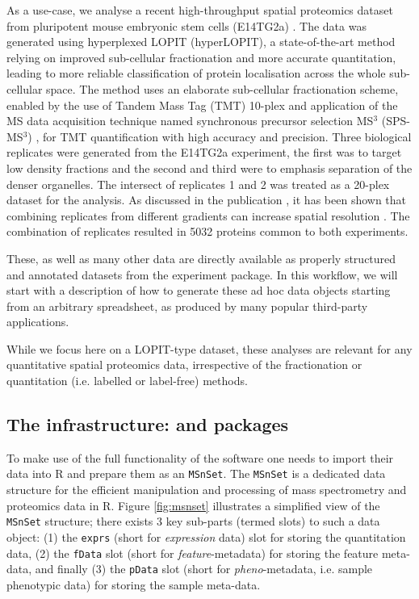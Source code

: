 As a use-case, we analyse a recent high-throughput spatial proteomics
dataset from pluripotent mouse embryonic stem cells (E14TG2a)
\cite{hyper}. The data was generated using hyperplexed LOPIT
(hyperLOPIT), a state-of-the-art method relying on improved
sub-cellular fractionation and more accurate quantitation, leading to
more reliable classification of protein localisation across the whole
sub-cellular space. The method uses an elaborate sub-cellular
fractionation scheme, enabled by the use of Tandem Mass Tag (TMT)
\cite{Thompson:2003} 10-plex and application of the MS data
acquisition technique named synchronous precursor selection MS$^3$
(SPS-MS$^3$) \cite{McAlister:2014}, for TMT quantification with high
accuracy and precision. Three biological replicates were generated
from the E14TG2a experiment, the first was to target low density
fractions and the second and third were to emphasis separation of the
denser organelles.  The intersect of replicates 1 and 2 was treated as
a 20-plex dataset for the analysis.  As discussed in the publication
\cite{hyper}, it has been shown that combining replicates from
different gradients can increase spatial resolution
\cite{Trotter:2010}. The combination of replicates resulted in 5032
proteins common to both experiments.

These, as well as many other data are directly available as properly
structured and annotated datasets from the 
experiment package. In this workflow, we will start with a description
of how to generate these ad hoc data objects starting from an
arbitrary spreadsheet, as produced by many popular third-party
applications.

While we focus here on a LOPIT-type dataset, these analyses are
relevant for any quantitative spatial proteomics data, irrespective of
the fractionation or quantitation (i.e. labelled or label-free)
methods.

\subsection*{The infrastructure:  and  packages}

To make use of the full functionality of the  software
one needs to import their data into R and prepare them as an
\texttt{MSnSet}. The \texttt{MSnSet} is a dedicated data structure for
the efficient manipulation and processing of mass spectrometry and
proteomics data in R. Figure \ref{fig:msnset} illustrates a simplified view of the
\texttt{MSnSet} structure; there exists 3 key sub-parts (termed slots)
to such a data object: (1) the \texttt{exprs} (short for
\textit{expression} data) slot for storing the quantitation data, (2)
the \texttt{fData} slot (short for \textit{feature}-metadata) for
storing the feature meta-data, and finally (3) the \texttt{pData} slot
(short for \textit{pheno}-metadata, i.e. sample phenotypic data) for
storing the sample meta-data.

